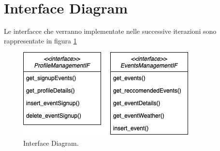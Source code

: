 \section{Interface Diagram}
Le interfacce che verranno implementate nelle successive iterazioni sono rappresentate in figura \ref{fig:InterfaceDiagram}
\begin{figure}[h!]
	\centering
	\includegraphics[width=0.8\linewidth]{Iterazione 1/diagrammi/interfacediagram.png}
	\caption{Interface Diagram.}
	\label{fig:InterfaceDiagram}
\end{figure}